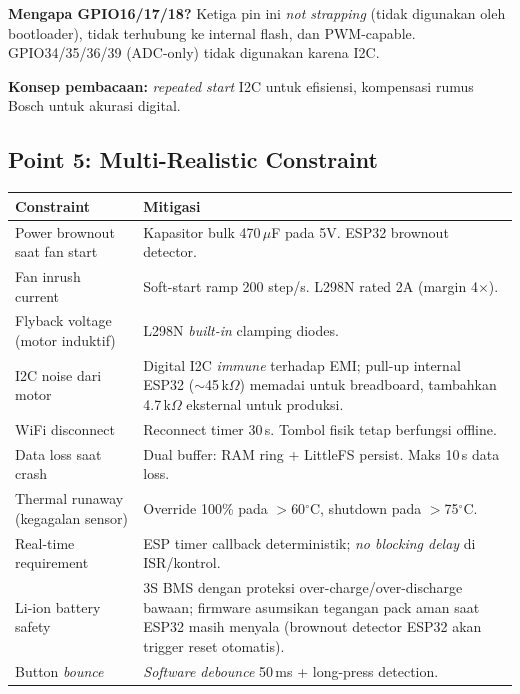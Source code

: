 \documentclass[11pt,a4paper]{article}
\begin{document}
\textbf{Mengapa GPIO16/17/18?} Ketiga pin ini \emph{not strapping} (tidak digunakan oleh bootloader), tidak terhubung ke internal flash, dan PWM-capable. GPIO34/35/36/39 (ADC-only) tidak digunakan karena I2C.

\textbf{Konsep pembacaan:} \emph{repeated start} I2C untuk efisiensi, kompensasi rumus Bosch untuk akurasi digital.

\subsection{Point 5: Multi-Realistic Constraint}

\begin{center}
\small
\begin{tabular}{p{4.5cm}p{9cm}}
\toprule
\textbf{Constraint} & \textbf{Mitigasi} \\
\midrule
Power brownout saat fan start & Kapasitor bulk 470\,$\mu$F pada 5V. ESP32 brownout detector. \\
\addlinespace
Fan inrush current & Soft-start ramp 200 step/s. L298N rated 2A (margin 4$\times$). \\
\addlinespace
Flyback voltage (motor induktif) & L298N \emph{built-in} clamping diodes. \\
\addlinespace
I2C noise dari motor & Digital I2C \emph{immune} terhadap EMI; pull-up internal ESP32 ($\sim$45\,k$\Omega$) memadai untuk breadboard, tambahkan 4.7\,k$\Omega$ eksternal untuk produksi. \\
\addlinespace
WiFi disconnect & Reconnect timer 30\,s. Tombol fisik tetap berfungsi offline. \\
\addlinespace
Data loss saat crash & Dual buffer: RAM ring + LittleFS persist. Maks 10\,s data loss. \\
\addlinespace
Thermal runaway (kegagalan sensor) & Override 100\% pada $>$60$^{\circ}$C, shutdown pada $>$75$^{\circ}$C. \\
\addlinespace
Real-time requirement & ESP timer callback deterministik; \emph{no blocking delay} di ISR/kontrol. \\
\addlinespace
Li-ion battery safety & 3S BMS dengan proteksi over-charge/over-discharge bawaan; firmware asumsikan tegangan pack aman saat ESP32 masih menyala (brownout detector ESP32 akan trigger reset otomatis). \\
\addlinespace
Button \emph{bounce} & \emph{Software debounce} 50\,ms + long-press detection. \\
\bottomrule
\end{tabular}
\end{center}
\end{document}
